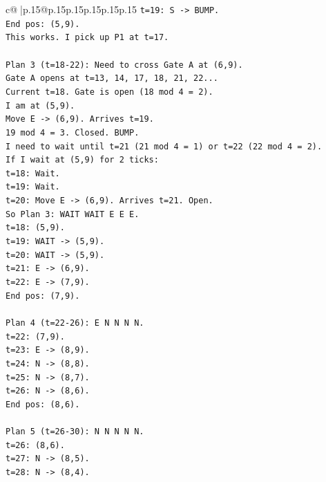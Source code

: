\documentclass{article}
\begin{document}
{\begin{supertabular}{c@{$\;$}|p{.15\linewidth}@{}p{.15\linewidth}p{.15\linewidth}p{.15\linewidth}p{.15\linewidth}p{.15\linewidth}}
{{{\texttt{t=19: S {-}> BUMP.} \\
\texttt{End pos: (5,9).} \\
\texttt{This works. I pick up P1 at t=17.} \\
\\ 
\texttt{Plan 3 (t=18{-}22): Need to cross Gate A at (6,9).} \\
\texttt{Gate A opens at t=13, 14, 17, 18, 21, 22...} \\
\texttt{Current t=18. Gate is open (18 mod 4 = 2).} \\
\texttt{I am at (5,9).} \\
\texttt{Move E {-}> (6,9). Arrives t=19.} \\
\texttt{19 mod 4 = 3. Closed. BUMP.} \\
\texttt{I need to wait until t=21 (21 mod 4 = 1) or t=22 (22 mod 4 = 2).} \\
\texttt{If I wait at (5,9) for 2 ticks:} \\
\texttt{t=18: Wait.} \\
\texttt{t=19: Wait.} \\
\texttt{t=20: Move E {-}> (6,9). Arrives t=21. Open.} \\
\texttt{So Plan 3: WAIT WAIT E E E.} \\
\texttt{t=18: (5,9).} \\
\texttt{t=19: WAIT {-}> (5,9).} \\
\texttt{t=20: WAIT {-}> (5,9).} \\
\texttt{t=21: E {-}> (6,9).} \\
\texttt{t=22: E {-}> (7,9).} \\
\texttt{End pos: (7,9).} \\
\\ 
\texttt{Plan 4 (t=22{-}26): E N N N N.} \\
\texttt{t=22: (7,9).} \\
\texttt{t=23: E {-}> (8,9).} \\
\texttt{t=24: N {-}> (8,8).} \\
\texttt{t=25: N {-}> (8,7).} \\
\texttt{t=26: N {-}> (8,6).} \\
\texttt{End pos: (8,6).} \\
\\ 
\texttt{Plan 5 (t=26{-}30): N N N N N.} \\
\texttt{t=26: (8,6).} \\
\texttt{t=27: N {-}> (8,5).} \\
\texttt{t=28: N {-}> (8,4).} \\
}}}
\end{supertabular}}
\end{document}
